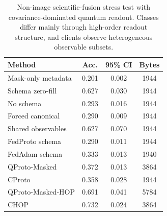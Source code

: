 \begin{table}[t]
\centering
\caption{Non-image scientific-fusion stress test with covariance-dominated quantum readout. Classes differ mainly through high-order readout structure, and clients observe heterogeneous observable subsets.}
\label{tab:if-scientific-fusion}
\begin{tabular}{lccc}
\toprule
Method & Acc. & 95\% CI & Bytes \\
\midrule
Mask-only metadata & 0.201 & 0.002 & 1944 \\
Schema zero-fill & 0.627 & 0.030 & 1944 \\
No schema & 0.293 & 0.016 & 1944 \\
Forced canonical & 0.290 & 0.009 & 1944 \\
Shared observables & 0.627 & 0.070 & 1944 \\
FedProto schema & 0.290 & 0.011 & 1944 \\
FedAdam schema & 0.333 & 0.013 & 1940 \\
QProto-Masked & 0.372 & 0.013 & 3864 \\
CProto & 0.358 & 0.028 & 1944 \\
QProto-Masked-HOP & 0.691 & 0.041 & 5784 \\
CHOP & 0.732 & 0.024 & 3864 \\
\bottomrule
\end{tabular}
\end{table}
